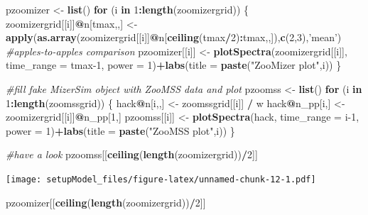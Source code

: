 \documentclass[
]{article}
\newenvironment{Shaded}{\begin{snugshade}}{\end{snugshade}}
\newcommand{\CommentTok}[1]{\textcolor[rgb]{0.56,0.35,0.01}{\textit{#1}}}
\newcommand{\ControlFlowTok}[1]{\textcolor[rgb]{0.13,0.29,0.53}{\textbf{#1}}}
\newcommand{\DataTypeTok}[1]{\textcolor[rgb]{0.13,0.29,0.53}{#1}}
\newcommand{\DecValTok}[1]{\textcolor[rgb]{0.00,0.00,0.81}{#1}}
\newcommand{\KeywordTok}[1]{\textcolor[rgb]{0.13,0.29,0.53}{\textbf{#1}}}
\newcommand{\NormalTok}[1]{#1}
\newcommand{\OperatorTok}[1]{\textcolor[rgb]{0.81,0.36,0.00}{\textbf{#1}}}
\newcommand{\StringTok}[1]{\textcolor[rgb]{0.31,0.60,0.02}{#1}}
\begin{document}
\begin{Shaded}
\begin{Highlighting}[]
\NormalTok{pzoomizer <-}\StringTok{ }\KeywordTok{list}\NormalTok{()}
\ControlFlowTok{for}\NormalTok{ (i }\ControlFlowTok{in} \DecValTok{1}\OperatorTok{:}\KeywordTok{length}\NormalTok{(zoomizergrid)) \{}
\NormalTok{  zoomizergrid[[i]]}\OperatorTok{@}\NormalTok{n[tmax,,] <-}\StringTok{ }\KeywordTok{apply}\NormalTok{(}\KeywordTok{as.array}\NormalTok{(zoomizergrid[[i]]}\OperatorTok{@}\NormalTok{n[}\KeywordTok{ceiling}\NormalTok{(tmax}\OperatorTok{/}\DecValTok{2}\NormalTok{)}\OperatorTok{:}\NormalTok{tmax,,]),}\KeywordTok{c}\NormalTok{(}\DecValTok{2}\NormalTok{,}\DecValTok{3}\NormalTok{),}\StringTok{'mean'}\NormalTok{) }\CommentTok{#apples-to-apples comparison}
\NormalTok{  pzoomizer[[i]] <-}\StringTok{ }\KeywordTok{plotSpectra}\NormalTok{(zoomizergrid[[i]], }\DataTypeTok{time_range =}\NormalTok{ tmax}\DecValTok{-1}\NormalTok{, }\DataTypeTok{power =} \DecValTok{1}\NormalTok{)}\OperatorTok{+}\KeywordTok{labs}\NormalTok{(}\DataTypeTok{title =} \KeywordTok{paste}\NormalTok{(}\StringTok{"ZooMizer plot"}\NormalTok{,i))}
\NormalTok{\}}

\CommentTok{#fill fake MizerSim object with ZooMSS data and plot}
\NormalTok{pzoomss <-}\StringTok{ }\KeywordTok{list}\NormalTok{()}
\ControlFlowTok{for}\NormalTok{ (i }\ControlFlowTok{in} \DecValTok{1}\OperatorTok{:}\KeywordTok{length}\NormalTok{(zoomssgrid)) \{}
\NormalTok{   hack}\OperatorTok{@}\NormalTok{n[i,,] <-}\StringTok{ }\NormalTok{zoomssgrid[[i]] }\OperatorTok{/}\StringTok{ }\NormalTok{w}
\NormalTok{   hack}\OperatorTok{@}\NormalTok{n_pp[i,] <-}\StringTok{ }\NormalTok{zoomizergrid[[i]]}\OperatorTok{@}\NormalTok{n_pp[}\DecValTok{1}\NormalTok{,]}
\NormalTok{   pzoomss[[i]] <-}\StringTok{ }\KeywordTok{plotSpectra}\NormalTok{(hack, }\DataTypeTok{time_range =}\NormalTok{ i}\DecValTok{-1}\NormalTok{, }\DataTypeTok{power =} \DecValTok{1}\NormalTok{)}\OperatorTok{+}\KeywordTok{labs}\NormalTok{(}\DataTypeTok{title =} \KeywordTok{paste}\NormalTok{(}\StringTok{"ZooMSS plot"}\NormalTok{,i))}
\NormalTok{\}}





\CommentTok{#have a look}
\NormalTok{pzoomss[[}\KeywordTok{ceiling}\NormalTok{(}\KeywordTok{length}\NormalTok{(zoomizergrid))}\OperatorTok{/}\DecValTok{2}\NormalTok{]]}
\end{Highlighting}
\end{Shaded}

\texttt{[image: setupModel\_files/figure-latex/unnamed-chunk-12-1.pdf]}

\begin{Shaded}
\begin{Highlighting}[]
\NormalTok{pzoomizer[[}\KeywordTok{ceiling}\NormalTok{(}\KeywordTok{length}\NormalTok{(zoomizergrid))}\OperatorTok{/}\DecValTok{2}\NormalTok{]]}
\end{Highlighting}
\end{Shaded}
\end{document}
